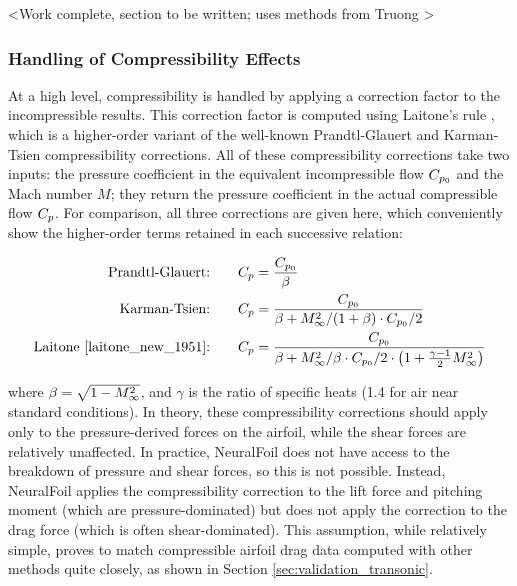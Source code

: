 \documentclass[conf]{new-aiaa}
\begin{document}
    <Work complete, section to be written; uses methods from Truong \cite{truong_analytical_2020}>

    \subsubsection{Handling of Compressibility Effects}
    \label{sec:compressibility}

    At a high level, compressibility is handled by applying a correction factor to the incompressible results. This correction factor is computed using Laitone's rule \cite{laitone_new_1951}, which is a higher-order variant of the well-known Prandtl-Glauert and Karman-Tsien compressibility corrections. All of these compressibility corrections take two inputs: the pressure coefficient in the equivalent incompressible flow $C_{p_0}$ and the Mach number $M$; they return the pressure coefficient in the actual compressible flow $C_p$. For comparison, all three corrections are given here, which conveniently show the higher-order terms retained in each successive relation:

    \begin{align}
        \label{eq:prandtl-glauert} \text{Prandtl-Glauert:} \qquad & C_p = \frac{C_{p_0}}{\beta} \\
        \label{eq:karman-tsien} \text{Karman-Tsien:}\qquad    & C_p = \frac{C_{p_0}}{\beta + M_\infty^2 / (1 + \beta) \cdot C_{p_0} / 2} \\
        \label{eq:laitone} \text{Laitone \cite{laitone_new_1951}:}\qquad & C_p = \frac{C_{p_0}}{\beta + M_\infty^2 / \beta \cdot C_{p_0} / 2 \cdot \left( 1 + \frac{\gamma - 1}{2} M_\infty^2 \right)}
    \end{align}

    \noindent where $\beta = \sqrt{1- M_\infty^2}$, and $\gamma$ is the ratio of specific heats (1.4 for air near standard conditions). In theory, these compressibility corrections should apply only to the pressure-derived forces on the airfoil, while the shear forces are relatively unaffected. In practice, NeuralFoil does not have access to the breakdown of pressure and shear forces, so this is not possible. Instead, NeuralFoil applies the compressibility correction to the lift force and pitching moment (which are pressure-dominated) but does not apply the correction to the drag force (which is often shear-dominated). This assumption, while relatively simple, proves to match compressible airfoil drag data computed with other methods quite closely, as shown in Section \ref{sec:validation_transonic}.
\end{document}
